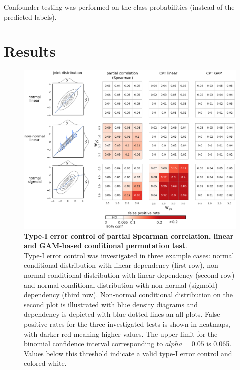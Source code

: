 \documentclass{article}
\begin{document}
Confounder testing was performed on the class probabilities (instead of the predicted labels).

\section{Results}

\begin{figure}[!b]
  \centering
  \includegraphics[width=0.75\paperwidth]{fig/sim_h0_demo.eps}
  \caption{\textbf{Type-I error control of partial Spearman correlation, linear and GAM-based conditional permutation test}. \\
  Type-I error control was investigated in three example cases: normal conditional distribution with linear dependency (first row), non-normal conditional distribution with linear dependency (second row) and normal conditional distribution with non-normal (sigmoid) dependency (third row). Non-normal conditional distribution on the second plot is illustrated with blue density diagrams and dependency is depicted with blue dotted lines an all plots. False positive rates for the three investigated tests is shown in heatmaps, with darker red meaning higher values. The upper limit for the binomial confidence interval corresponding to $alpha=0.05$ is 0.065. Values below this threshold indicate a valid type-I error control and colored white.
  }
  \label{fig:sim-h0-demo}
\end{figure}
\end{document}
